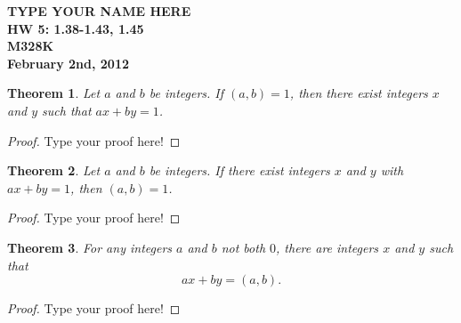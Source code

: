 \documentclass[12pt,leqno]{article}
\numberwithin{equation}{section}
\newtheorem{thm}{Theorem}[section]
\theoremstyle{definition}
\begin{document}
\thispagestyle{plain}
\begin{flushright}
\large{\textbf{TYPE YOUR NAME HERE \\
HW 5: 1.38-1.43, 1.45\\
M328K \\
February 2nd, 2012 \\}}
\end{flushright}

\markboth{}{} \setcounter{section}{0} \baselineskip=18pt

\setcounter{tocdepth}{4}



\setcounter{section}{1}

\setcounter{thm}{37}

\begin{thm}
Let $a$ and $b$ be integers. If $(a, b) = 1$, then there exist
integers $x$ and $y$ such that $ax + by = 1$. \end{thm}

\begin{proof}[Proof]
Type your proof here!
\end{proof}

\begin{thm}
Let $a$ and $b$ be integers. If there exist integers $x$ and $y$
with $ax + by = 1$, then $(a, b) = 1$.
\end{thm}

\begin{proof}[Proof]
Type your proof here!
\end{proof}

\begin{thm}
For any integers $a$ and $b$ not both $0$, there are integers $x$
and $y$ such that \[ax + by = (a, b).\]
\end{thm}

\begin{proof}[Proof]
Type your proof here!
\end{proof}
\end{document}
